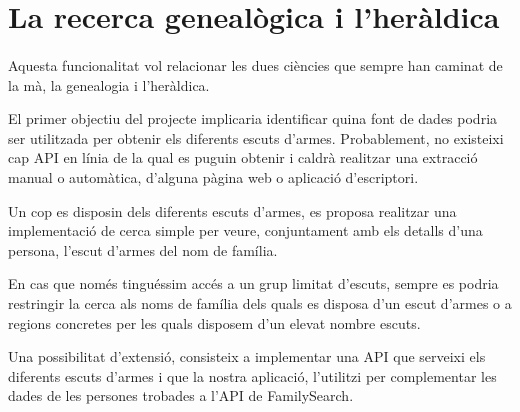 \section{La recerca genealògica i l'heràldica}

    \paragraph{}
    Aquesta funcionalitat vol relacionar les dues ciències que sempre han caminat de la mà, la genealogia i l'heràldica.

    El primer objectiu del projecte implicaria identificar quina font de dades podria ser utilitzada per obtenir els diferents escuts d'armes. Probablement, no existeixi cap API en línia de la qual es puguin obtenir i caldrà realitzar una extracció manual o automàtica, d'alguna pàgina web o aplicació d'escriptori.

    Un cop es disposin dels diferents escuts d'armes, es proposa realitzar una implementació de cerca simple per veure, conjuntament amb els detalls d'una persona, l'escut d'armes del nom de família.

    En cas que només tinguéssim accés a un grup limitat d'escuts, sempre es podria restringir la cerca als noms de família dels quals es disposa d'un escut d'armes o a regions concretes per les quals disposem d'un elevat nombre escuts.

    Una possibilitat d'extensió, consisteix a implementar una API que serveixi els diferents escuts d'armes i que la nostra aplicació, l'utilitzi per complementar les dades de les persones trobades a l'API de FamilySearch.
